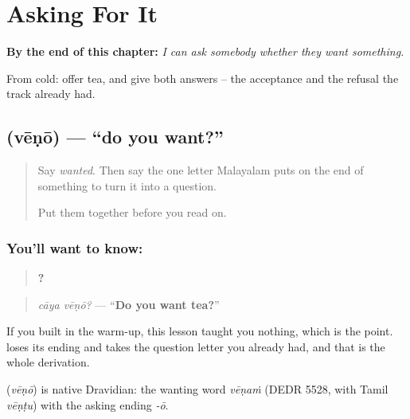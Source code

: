 
\chapter{Asking For It}
\label{ch:ml-venam}

\begin{chapteropening}
\textbf{By the end of this chapter:} \emph{I can ask somebody whether they want something.}

From cold: offer tea, and give both answers -- the acceptance and the refusal the track already had.
\end{chapteropening}

\section[\texorpdfstring{\ml{വേണോ} (vēṇō)}{വേണോ (vēṇō)}]{ (vēṇō) — \textquotedblleft{}do you want?\textquotedblright{}}

\label{lesson:ML-C76-veno}



\begin{quote}
Say \emph{wanted}. Then say the one letter Malayalam puts on the end of something to turn it into a question.

Put them together before you read on.
\end{quote}

\subsection*{You'll want to know: }
\begin{quote}
\textbf{ ?}
\end{quote}

\begin{quote}
\emph{cāya vēṇō?} — \textquotedblleft{}\textbf{Do you want tea?}\textquotedblright{}
\end{quote}

If you built \textbf{} in the warm-up, this lesson taught you nothing, which is the point. \textbf{} loses its ending and takes the question letter you already had, and that is the whole derivation.

\begin{cousinweb}
\textbf{} (\emph{vēṇō}) is native Dravidian: the wanting word \emph{vēṇaṁ} (DEDR 5528, with Tamil \emph{vēṇṭu}) with the asking ending \emph{-ō}.
\end{cousinweb}

